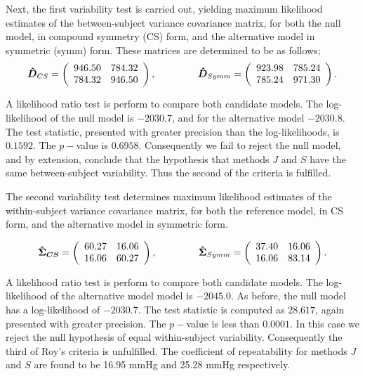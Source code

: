 \documentclass[12pt, a4paper]{report}
\theoremstyle{plain}
\theoremstyle{definition}
\theoremstyle{remark}
\begin{document}
	Next, the first variability test is carried out, yielding maximum likelihood estimates of the between-subject variance covariance matrix, for both the null model, in compound symmetry (CS) form, and the alternative model in symmetric (symm) form. These matrices are determined to be as follows;
	\[
	\boldsymbol{\hat{D}}_{CS} = \left( \begin{array}{cc}
	946.50 & 784.32  \\
	784.32 & 946.50  \\
	\end{array}\right),
	\hspace{1.5cm}
	\boldsymbol{\hat{D}}_{Symm} = \left( \begin{array}{cc}
	923.98 & 785.24  \\
	785.24 & 971.30  \\
	\end{array}\right).
	\]
	
	A likelihood ratio test is perform to compare both candidate models. The log-likelihood of the null model is $-2030.7$, and for the alternative model $-2030.8$. The test statistic, presented with greater precision than the log-likelihoods, is $0.1592$. The $p-$value is $0.6958$. Consequently we fail to reject the null model, and by extension, conclude that the hypothesis that methods $J$ and $S$ have the same between-subject variability. Thus the second of the criteria is fulfilled.
	
	The second variability test determines maximum likelihood estimates of the within-subject variance covariance matrix, for both the reference model, in CS form, and the alternative model in symmetric form.
	
	\[
	\boldsymbol{\hat{\Sigma}_{CS}} = \left( \begin{array}{cc}
	60.27  & 16.06  \\
	16.06  & 60.27  \\
	\end{array}\right),
	\hspace{1.5cm}
	\boldsymbol{\hat{\Sigma}}_{Symm} = \left( \begin{array}{cc}
	37.40 & 16.06  \\
	16.06 & 83.14  \\
	\end{array}\right).
	\]
	
A likelihood ratio test is perform to compare both candidate models. The log-likelihood of the alternative model model is $-2045.0$. As before, the null model has a log-likelihood of $-2030.7$. The test statistic is computed as $28.617$, again presented with greater precision. The $p-$value is less than $0.0001$. In this case we reject the null hypothesis of equal within-subject variability. Consequently the third of Roy's criteria is unfulfilled.
The coefficient of repeatability for methods $J$ and $S$ are found to be 16.95 mmHg and 25.28 mmHg respectively.
\end{document}
